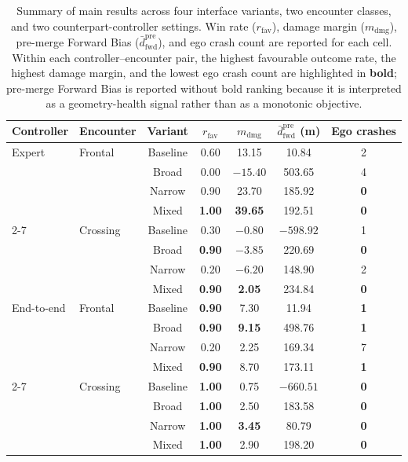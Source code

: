 \documentclass[drones,article,submit,pdftex,moreauthors]{Definitions/mdpi}
\begin{document}
\begin{table}[t]
\centering
\caption{Summary of main results across four interface variants, two encounter classes, and two counterpart-controller settings. Win rate ($r_{\mathrm{fav}}$), damage margin ($m_{\mathrm{dmg}}$), pre-merge Forward Bias ($\bar{d}_{\mathrm{fwd}}^{\mathrm{pre}}$), and ego crash count are reported for each cell. Within each controller--encounter pair, the highest favourable outcome rate, the highest damage margin, and the lowest ego crash count are highlighted in \textbf{bold}; pre-merge Forward Bias is reported without bold ranking because it is interpreted as a geometry-health signal rather than as a monotonic objective.}
\label{tab:main_results}
\begin{tabular}{@{}llccccc@{}}
\toprule
Controller & Encounter & Variant & $r_{\mathrm{fav}}$ & $m_{\mathrm{dmg}}$ & $\bar{d}_{\mathrm{fwd}}^{\mathrm{pre}}$ (m) & Ego crashes \\
\midrule
Expert & Frontal & Baseline & 0.60 & 13.15 & 10.84 & 2 \\
& & Broad & 0.00 & $-15.40$ & 503.65 & 4 \\
& & Narrow & 0.90 & 23.70 & 185.92 & \textbf{0} \\
& & Mixed & \textbf{1.00} & \textbf{39.65} & 192.51 & \textbf{0} \\
\cmidrule{2-7}
& Crossing & Baseline & 0.30 & $-0.80$ & $-598.92$ & 1 \\
& & Broad & \textbf{0.90} & $-3.85$ & 220.69 & \textbf{0} \\
& & Narrow & 0.20 & $-6.20$ & 148.90 & 2 \\
& & Mixed & \textbf{0.90} & \textbf{2.05} & 234.84 & \textbf{0} \\
\midrule
End-to-end & Frontal & Baseline & \textbf{0.90} & 7.30 & 11.94 & \textbf{1} \\
& & Broad & \textbf{0.90} & \textbf{9.15} & 498.76 & \textbf{1} \\
& & Narrow & 0.20 & 2.25 & 169.34 & 7 \\
& & Mixed & \textbf{0.90} & 8.70 & 173.11 & \textbf{1} \\
\cmidrule{2-7}
& Crossing & Baseline & \textbf{1.00} & 0.75 & $-660.51$ & \textbf{0} \\
& & Broad & \textbf{1.00} & 2.50 & 183.58 & \textbf{0} \\
& & Narrow & \textbf{1.00} & \textbf{3.45} & 80.79 & \textbf{0} \\
& & Mixed & \textbf{1.00} & 2.90 & 198.20 & \textbf{0} \\
\bottomrule
\end{tabular}
\end{table}
\end{document}
